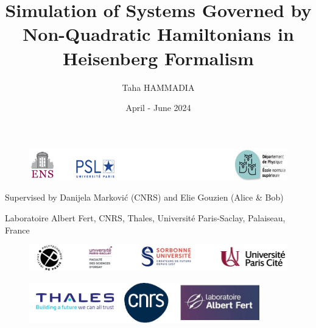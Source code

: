 \documentclass[a4paper,11pt,english]{report}
\title{Simulation of Systems Governed by Non-Quadratic Hamiltonians in Heisenberg Formalism}
\author{Taha HAMMADIA}
\date{April - June 2024}
\begin{document}
\newcommand{\timeDeriv}[1]{\dv{#1}{t}}
\newcommand{\ihbar}{\frac{1}{i \hbar}}
\newcommand{\floor}[1]{\left\lfloor #1 \right\rfloor}
\newcommand{\ceil}[1]{\left\lceil #1 \right\rceil}
\newcommand{\average}[1]{\left\langle #1 \right\rangle}
\newcommand{\cumulant}[2]{\left\langle #1;#2 \right\rangle_c}
\newcommand{\normOrd}[1]{:#1:}
\newcommand{\proj}[2]{\ket{#1}\bra{#2}}
\newcommand{\kronecher}[2]{\delta_{#1, #2}}
\newcommand{\weyl}[1]{\{#1\}_S}
\newcommand{\anticomm}[2]{\left\{#1, #2\right\}}
\newcommand{\Comm}[3]{\text{Comm}_{#1}\left(#2 | #3\right)}
\newcommand{\poly}[2]{\text{poly}_{#1}\left(#2\right)}
\newcommand{\texp}[1]{\mathcal{T}\exp{\int_{0}^t dt' #1(t')}}
\newcommand{\Texp}[1]{\mathcal{T}\exp{#1}}
\newcommand{\pr}[1]{\text{Pr}[#1]}
\newcommand{\LS}[1]{\mathcal{L}_S\left(#1\right)}
\newcommand{\LSS}[2]{\mathcal{L}^{(#1)}_S\left(#2\right)}
\newcommand{\heis}[1]{\left(#1\right)_H}
\newcommand{\algorithmautorefname}{Algorithm}

\begin{figure}
    \centering
    \includegraphics[width=15cm]{Pics/Logo1.png}
\end{figure}
{\let\newpage\relax\maketitle}
\begin{center}
     Supervised by Danijela Marković (CNRS) and Elie Gouzien (Alice \& Bob)
\end{center}
\vfill
\begin{center}
     Laboratoire Albert Fert, CNRS, Thales, Université Paris-Saclay, Palaiseau, France
\end{center}
\vfill
\begin{center}
    \begin{figure}[h!]
    \centering
    \includegraphics[width=15cm]{Pics/Logo2.png}
\end{figure}
\end{center}

\vfill

\begin{center}
    \begin{figure}[h!]
    \centering
    \includegraphics[width=10cm]{Pics/Logo3.png}
\end{figure}
\end{center}
\end{document}
